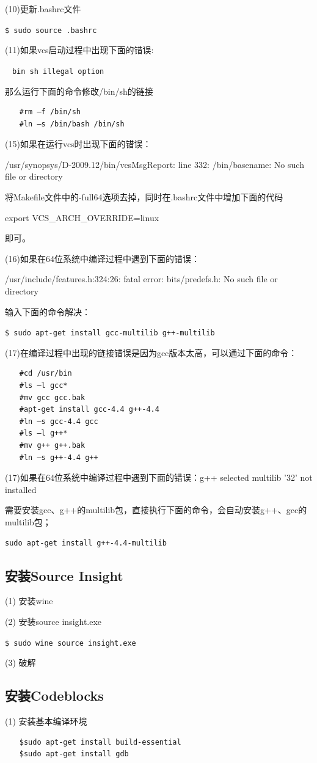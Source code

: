 (10)更新.bashrc文件

\verb"$ sudo source .bashrc"

(11)如果vcs启动过程中出现下面的错误:

\verb"　bin sh illegal option"

那么运行下面的命令修改/bin/sh的链接
\begin{verbatim}
　　#rm –f /bin/sh
　　#ln –s /bin/bash /bin/sh
\end{verbatim}

(15)如果在运行vcs时出现下面的错误：

/usr/synopsys/D-2009.12/bin/vcsMsgReport: line 332: /bin/basename: No such file or directory

将Makefile文件中的-full64选项去掉，同时在.bashrc文件中增加下面的代码

export VCS\_ARCH\_OVERRIDE=linux

即可。

(16)如果在64位系统中编译过程中遇到下面的错误：

/usr/include/features.h:324:26: fatal error: bits/predefs.h: No such file or directory

输入下面的命令解决：

\verb"$ sudo apt-get install gcc-multilib g++-multilib"

(17)在编译过程中出现的链接错误是因为gcc版本太高，可以通过下面的命令：
\begin{verbatim}
　　#cd /usr/bin
　　#ls –l gcc*
　　#mv gcc gcc.bak
　　#apt-get install gcc-4.4 g++-4.4
　　#ln –s gcc-4.4 gcc
　　#ls –l g++*
　　#mv g++ g++.bak
　　#ln –s g++-4.4 g++
\end{verbatim}

(17)如果在64位系统中编译过程中遇到下面的错误：g++ selected multilib '32' not installed

需要安装gcc、g++的multilib包，直接执行下面的命令，会自动安装g++、gcc的multilib包；
\begin{verbatim}
sudo apt-get install g++-4.4-multilib
\end{verbatim}

\subsection{安装Source Insight}
(1) 安装wine

(2) 安装source insight.exe

\verb"$ sudo wine source insight.exe"

(3) 破解

\subsection{安装Codeblocks}
(1) 安装基本编译环境
\begin{verbatim}
　　$sudo apt-get install build-essential
　　$sudo apt-get install gdb
\end{verbatim}

